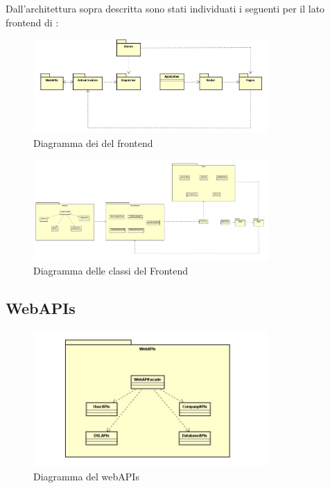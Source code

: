 Dall'architettura sopra descritta sono stati individuati i seguenti  per il lato frontend di :

\begin{figure}[H]
\centering
\includegraphics[width=0.8\textwidth]{res/sections/imgs/packages-diagram.jpg}
\caption{Diagramma dei  del frontend}
\end{figure}

\begin{figure}[H]
\centering
\includegraphics[width=0.8\textwidth]{res/sections/frontend/fullFrontend.jpg}
\caption{Diagramma delle classi del Frontend}
\end{figure}

\subsection{WebAPIs}

\begin{figure}[h]
\centering
\includegraphics[width=0.8\textwidth]{res/sections/imgs/webapi-diagram.jpg}
\caption{Diagramma del  webAPIs}
\end{figure}

